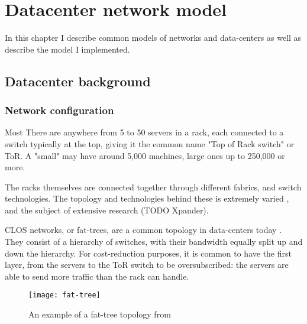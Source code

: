 \chapter{Datacenter network model} \label{model}

In this chapter I describe common models of networks and data-centers as well as describe the model I implemented.

\section{Datacenter background} \label{model-dc}

\subsection{Network configuration} \label{model-network}

Most \datacenters \rotornet\cite{handley_re-architecting_2017}\opera {}
There are anywhere from 5 to 50 servers in a rack, each connected to a switch typically at the top, giving it the common name "Top of Rack switch" or ToR. 
A "small" \datacenter may have around 5,000 machines, large ones up to 250,000 or more. %

The racks themselves are connected together through different fabrics, and switch technologies.
The topology and technologies behind these is extremely varied \cite{kassing_beyond_2017}, and the subject of extensive research \opera\rotornet (TODO Xpander).  %

CLOS networks, or fat-trees, are a common topology in data-centers  today \cite{singh_jupiter_2015}\cite{noauthor_reinventing_2019}\cite{noauthor_introducing_2014}.
They consist of a hierarchy of switches, with their bandwidth equally split up and down the hierarchy.
For cost-reduction purposes, it is common to have the first layer, from the servers to the ToR switch to be oversubscribed: the servers are able to send more traffic than the rack can handle. 

\begin{figure}[h]
    \centering
    \texttt{[image: fat-tree]}
    \label{fig:fat-tree}
    \caption{An example of a fat-tree topology from \cite{al-fares_scalable_2008}}
\end{figure}

